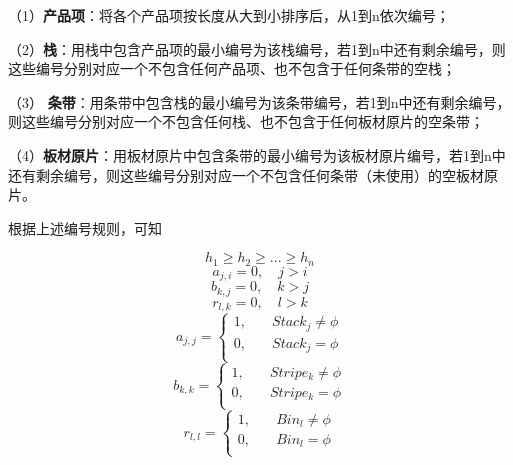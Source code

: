 \documentclass[bwprint]{gmcmthesis}
\begin{document}
（1）\textbf{产品项}：将各个产品项按长度从大到小排序后，从1到n依次编号；

（2）\textbf{栈}：用栈中包含产品项的最小编号为该栈编号，若1到n中还有剩余编号，则这些编号分别对应一个不包含任何产品项、也不包含于任何条带的空栈；

（3） \textbf{条带}：用条带中包含栈的最小编号为该条带编号，若1到n中还有剩余编号，则这些编号分别对应一个不包含任何栈、也不包含于任何板材原片的空条带；

（4）\textbf{板材原片}：用板材原片中包含条带的最小编号为该板材原片编号，若1到n中还有剩余编号，则这些编号分别对应一个不包含任何条带（未使用）的空板材原片。

根据上述编号规则，可知

\begin{equation}
    h_{1} \ge h_{2} \ge ... \ge h_{n}
\end{equation} 
\begin{equation}
    a_{j,i}=0, \quad   j>i
\end{equation}
\begin{equation}
    b_{k,j}=0, \quad   k>j
\end{equation}
\begin{equation}
    r_{l,k}=0, \quad   l>k
\end{equation}
\begin{equation}
    a_{j,j}=
    \begin{cases}
        1, \quad  & Stack_j \neq  \phi  \\
        0,\quad  & Stack_j  =  \phi  \\
    \end{cases}
\end{equation}
\begin{equation}
    b_{k,k}=
    \begin{cases}
        1, \quad  & Stripe_k \neq  \phi  \\
        0,\quad  & Stripe_k =  \phi  \\
    \end{cases}
\end{equation}
\begin{equation}
    r_{l,l}=
    \begin{cases}
        1, \quad  & Bin_l \neq  \phi  \\
        0,\quad  & Bin_l = \phi  \\
    \end{cases}
\end{equation}
\end{document}
